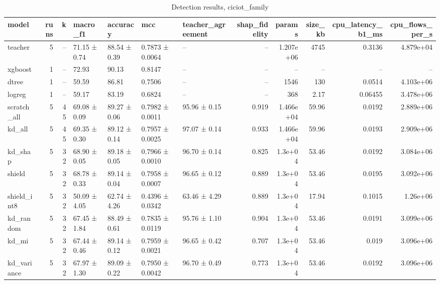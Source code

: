 \begin{table}
\caption{Detection results, ciciot_family}
\begin{tabular}{lrrllllrrrrr}
\toprule
model & runs & k & macro_f1 & accuracy & mcc & teacher_agreement & shap_fidelity & params & size_kb & cpu_latency_b1_ms & cpu_flows_per_s \\
\midrule
teacher & 5 & -- & 71.15 ± 0.74 & 88.54 ± 0.39 & 0.7873 ± 0.0064 & -- & -- & 1.207e+06 & 4745 & 0.3136 & 4.879e+04 \\
xgboost & 1 & -- & 72.93 & 90.13 & 0.8147 & -- & -- & -- & -- & -- & -- \\
dtree & 1 & -- & 59.59 & 86.81 & 0.7506 & -- & -- & 1546 & 130 & 0.0514 & 4.103e+06 \\
logreg & 1 & -- & 59.17 & 83.19 & 0.6824 & -- & -- & 368 & 2.17 & 0.06455 & 3.478e+06 \\
scratch_all & 5 & 45 & 69.08 ± 0.09 & 89.27 ± 0.06 & 0.7982 ± 0.0011 & 95.96 ± 0.15 & 0.919 & 1.466e+04 & 59.96 & 0.0192 & 2.889e+06 \\
kd_all & 5 & 45 & 69.35 ± 0.30 & 89.12 ± 0.14 & 0.7957 ± 0.0025 & 97.07 ± 0.14 & 0.933 & 1.466e+04 & 59.96 & 0.0193 & 2.909e+06 \\
kd_shap & 5 & 32 & 68.90 ± 0.05 & 89.18 ± 0.05 & 0.7966 ± 0.0010 & 96.70 ± 0.14 & 0.825 & 1.3e+04 & 53.46 & 0.0192 & 3.084e+06 \\
shield & 5 & 32 & 68.78 ± 0.33 & 89.14 ± 0.04 & 0.7958 ± 0.0007 & 96.65 ± 0.12 & 0.889 & 1.3e+04 & 53.46 & 0.0195 & 3.092e+06 \\
shield_int8 & 5 & 32 & 50.09 ± 4.05 & 62.74 ± 4.26 & 0.4396 ± 0.0342 & 63.46 ± 4.29 & 0.889 & 1.3e+04 & 17.94 & 0.1015 & 1.26e+06 \\
kd_random & 5 & 32 & 67.45 ± 1.84 & 88.49 ± 0.61 & 0.7835 ± 0.0119 & 95.76 ± 1.10 & 0.904 & 1.3e+04 & 53.46 & 0.0191 & 3.099e+06 \\
kd_mi & 5 & 32 & 67.44 ± 0.46 & 89.14 ± 0.12 & 0.7959 ± 0.0021 & 96.65 ± 0.42 & 0.707 & 1.3e+04 & 53.46 & 0.019 & 3.096e+06 \\
kd_variance & 5 & 32 & 67.97 ± 1.30 & 89.09 ± 0.22 & 0.7950 ± 0.0042 & 96.70 ± 0.49 & 0.773 & 1.3e+04 & 53.46 & 0.0192 & 3.096e+06 \\
\bottomrule
\end{tabular}
\end{table}
